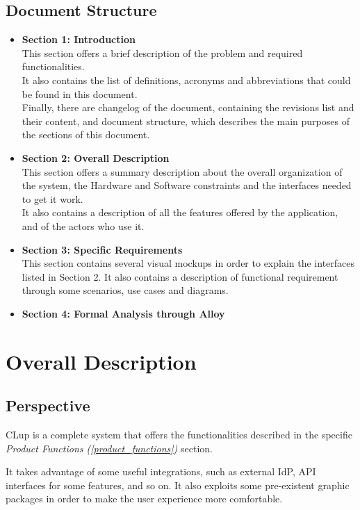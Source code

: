 \documentclass[table, 12pt]{article}
\begin{document}
\subsection{Document Structure}
\begin{itemize}
    \item {\textbf{Section 1: Introduction}\\This section offers a brief description of the problem and required functionalities. \\It also contains the list of definitions, acronyms and abbreviations that could be found in this document. \\Finally, there are changelog of the document, containing the revisions list and their content, and document structure, which describes the main purposes of the sections of this document.}
    \item {\textbf{Section 2: Overall Description}\\This section offers a summary description about the overall organization of the system, the Hardware and Software constraints and the interfaces needed to get it work.\\It also contains a description of all the features offered by the application, and of the actors who use it.}
    \item {\textbf{Section 3: Specific Requirements}\\This section contains several visual mockups in order to explain the interfaces listed in Section 2. It also contains a description of functional requirement through some scenarios, use cases and diagrams.}
    \item {\textbf{Section 4: Formal Analysis through Alloy}}
\end{itemize}
\newpage
\section{Overall Description}
\subsection{Perspective}
CLup is a complete system that offers the functionalities described in the specific \textit{Product Functions (\ref{product_functions})} section.

It takes advantage of some useful integrations, such as external IdP, API interfaces for some features, and so on. It also exploits some pre-existent graphic packages in order to make the user experience more comfortable.
\end{document}
